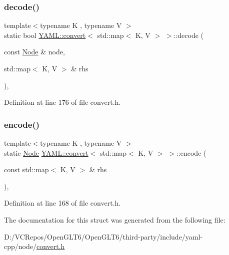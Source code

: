 \subsubsection{\texorpdfstring{decode()}{decode()}}
{\footnotesize\ttfamily template$<$typename K , typename V $>$ \\
static bool \mbox{\hyperlink{struct_y_a_m_l_1_1convert}{Y\+A\+M\+L\+::convert}}$<$ std\+::map$<$ K, V $>$ $>$\+::decode (\begin{DoxyParamCaption}\item[{const \mbox{\hyperlink{class_y_a_m_l_1_1_node}{Node}} \&}]{node,  }\item[{std\+::map$<$ K, V $>$ \&}]{rhs }\end{DoxyParamCaption})\hspace{0.3cm}{\ttfamily [inline]}, {\ttfamily [static]}}



Definition at line 176 of file convert.\+h.

\mbox{\label{struct_y_a_m_l_1_1convert_3_01std_1_1map_3_01_k_00_01_v_01_4_01_4_a2b2690ea4922d3d843951496105d190f}} 
\subsubsection{\texorpdfstring{encode()}{encode()}}
{\footnotesize\ttfamily template$<$typename K , typename V $>$ \\
static \mbox{\hyperlink{class_y_a_m_l_1_1_node}{Node}} \mbox{\hyperlink{struct_y_a_m_l_1_1convert}{Y\+A\+M\+L\+::convert}}$<$ std\+::map$<$ K, V $>$ $>$\+::encode (\begin{DoxyParamCaption}\item[{const std\+::map$<$ K, V $>$ \&}]{rhs }\end{DoxyParamCaption})\hspace{0.3cm}{\ttfamily [inline]}, {\ttfamily [static]}}



Definition at line 168 of file convert.\+h.



The documentation for this struct was generated from the following file\+:\begin{DoxyCompactItemize}
\item 
D\+:/\+V\+C\+Repos/\+Open\+G\+L\+T6/\+Open\+G\+L\+T6/third-\/party/include/yaml-\/cpp/node/\mbox{\hyperlink{convert_8h}{convert.\+h}}\end{DoxyCompactItemize}
